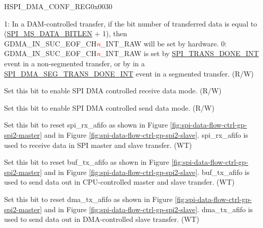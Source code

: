 \begin{register}{H}{SPI\_DMA\_CONF\_REG}{0x0030}
\begin{regdesc}
\begin{reglist}
\label{fielddesc:SPIRXEOFEN}\item [SPI\_RX\_EOF\_EN] 1: In a DAM-controlled transfer, if the bit number of
transferred data is equal to (\hyperref[fielddesc:SPIMSDATABITLEN]{SPI\_MS\_DATA\_BITLEN} + 1), then GDMA\_IN\_SUC\_EOF\_CH\textcolor{red}{\it{n}}\_INT\_RAW will be set by hardware. 0: GDMA\_IN\_SUC\_EOF\_CH\textcolor{red}{\it{n}}\_INT\_RAW is set by \hyperref[int:SPITRANSDONEINT]{SPI\_TRANS\_DONE\_INT} event in a non-segmented transfer, or by in a \hyperref[int:SPIDMASEGTRANSDONEINT]{SPI\_DMA\_SEG\_TRANS\_DONE\_INT} event in a segmented transfer. (R/W)
\label{fielddesc:SPIDMARXENA}\item [SPI\_DMA\_RX\_ENA] Set this bit to enable SPI DMA controlled receive data mode. (R/W)
\label{fielddesc:SPIDMATXENA}\item [SPI\_DMA\_TX\_ENA] Set this bit to enable SPI DMA controlled send data mode. (R/W)
\label{fielddesc:SPIRXAFIFORST}\item [SPI\_RX\_AFIFO\_RST] Set this bit to reset spi\_rx\_afifo as shown in Figure \ref{fig:spi-data-flow-ctrl-gp-spi2-master} and in Figure  \ref{fig:spi-data-flow-ctrl-gp-spi2-slave}. spi\_rx\_afifo is used to receive data in SPI master and slave transfer. (WT)
\label{fielddesc:SPIBUFAFIFORST}\item [SPI\_BUF\_AFIFO\_RST] Set this bit to reset buf\_tx\_afifo as shown in Figure \ref{fig:spi-data-flow-ctrl-gp-spi2-master} and in Figure  \ref{fig:spi-data-flow-ctrl-gp-spi2-slave}. buf\_tx\_afifo is used to send data out in CPU-controlled master and slave transfer. (WT)
\label{fielddesc:SPIDMAAFIFORST}\item [SPI\_DMA\_AFIFO\_RST] Set this bit to reset dma\_tx\_afifo as shown in Figure \ref{fig:spi-data-flow-ctrl-gp-spi2-master} and in Figure  \ref{fig:spi-data-flow-ctrl-gp-spi2-slave}. dma\_tx\_afifo is used to send data out in DMA-controlled slave transfer. (WT)
\end{reglist}\end{regdesc}
\end{register}


